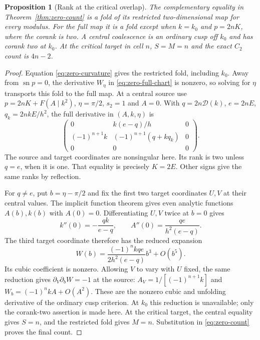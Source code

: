 \documentclass[11pt,a4paper]{article}
\newtheorem{proposition}[theorem]{Proposition}
\theoremstyle{remark}\newtheorem{remark}[theorem]{Remark}
\newcommand{\sn}{\operatorname{sn}}
\begin{document}
\begin{proposition}[Rank at the critical overlap]\label{prop:zero-rank}
The complementary equality in Theorem~\ref{thm:zero-count} is a fold
of its restricted two-dimensional map for every modulus. For the full
map it is a fold except when $k=k_0$ and $p=2nK$, where the corank
is two. A central coalescence is an ordinary cusp off $k_0$ and has
corank two at $k_0$. At the critical target in cell $n$, $S=M=n$ and the exact
$C_2$ count is $4n-2$.
\end{proposition}
\begin{proof}
Equation \eqref{eq:zero-curvature} gives the restricted fold, including
$k_0$. Away from $\sn p=0$, the derivative $W_\eta$ in
\eqref{eq:zero-full-chart} is nonzero, so solving for $\eta$ transports
this fold to the full map. At a central source use
$p=2nK+F(A\mid k^2)$, $\eta=\pi/2$, $s_2=1$ and $A=0$.
With $q=2n\mathcal D(k)$, $e=2nE$, $q_k=2nkE/h^2$, the full
derivative in $(A,k,\eta)$ is
\[
 \begin{pmatrix}
 0&k(e-q)/h&0\\
 (-1)^{n+1}k&(-1)^{n+1}(q+kq_k)&0\\
 0&0&0
 \end{pmatrix}.
\]
The source and target coordinates are nonsingular here. Its rank is two
unless $q=e$, when it is one. That equality is precisely $K=2E$.
Other signs give the same ranks by reflection.

For $q\ne e$, put $b=\eta-\pi/2$ and fix the first two target
coordinates $U,V$ at their central values. The implicit function theorem
gives even analytic functions $A(b),k(b)$ with $A(0)=0$.
Differentiating $U,V$ twice at $b=0$ gives
\[
 k''(0)=-\frac{qk}{e-q},\qquad
 A''(0)=\frac{qe}{h^2(e-q)}.
\]
The third target coordinate therefore has the reduced expansion
\[
 W(b)=\frac{(-1)^n kqe}{2h^2(e-q)}b^3+O(b^5).
\]
Its cubic coefficient is nonzero. Allowing $V$ to vary with $U$ fixed,
the same reduction gives $\partial_V\partial_bW=-1$ at the source:
$A_V=1/[(-1)^{n+1}k]$ and $W_b=(-1)^nkA+O(A^2)$.
These are the nonzero cubic and unfolding derivative of the ordinary
cusp criterion. At $k_0$ this reduction is unavailable; only the
corank-two assertion is made here. At the critical target, the central
equality gives $S=n$, and the restricted fold gives $M=n$.
Substitution in \eqref{eq:zero-count} proves the final count.
\end{proof}
\end{document}
